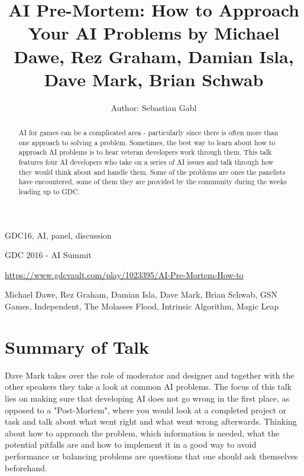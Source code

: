 \documentclass[a4paper]{article}
\title{AI Pre-Mortem: How to Approach Your AI Problems by Michael Dawe, Rez Graham, Damian Isla, Dave Mark, Brian Schwab}
\author{Author: Sebastian Gabl}
\begin{document}
\maketitle

\begin{keywords} GDC16, AI, panel, discussion \end{keywords}

\begin{track} GDC 2016 - AI Summit \end{track}

\begin{talkurl}  \url{https://www.gdcvault.com/play/1023395/AI-Pre-Mortem-How-to} \end{talkurl}

\begin{speaker}Michael Dawe, Rez Graham, Damian Isla, Dave Mark, Brian Schwab, GSN Games, Independent, The Molasses Flood, Intrinsic Algorithm, Magic Leap \end{speaker}


\begin{abstract}
AI for games can be a complicated area - particularly since there is often more than one approach to solving a problem. Sometimes, the best way to learn about how to approach AI problems is to hear veteran developers work through them. This talk features four AI developers who take on a series of AI issues and talk through how they would think about and handle them. Some of the problems are ones the panelists have encountered, some of them they are provided by the community during the weeks leading up to GDC.
\end{abstract}

\section{Summary of Talk}

Dave Mark takes over the role of moderator and designer and together with the other speakers they take a look at common AI problems. The focus of this talk lies on making sure that developing AI does not go wrong in the first place, as opposed to a "Post-Mortem", where you would look at a completed project or task and talk about what went right and what went wrong afterwards. Thinking about how to approach the problem, which information is needed, what the potential pitfalls are and how to implement it in a good way to avoid performance or balancing problems are questions that one should ask themselves beforehand.
\end{document}
